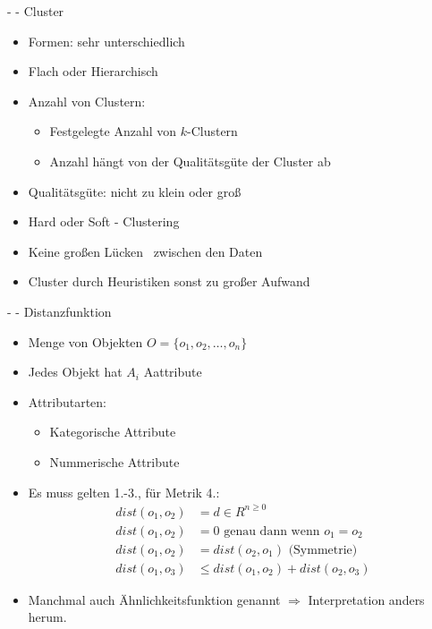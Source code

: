 \documentclass[fleqn,11pt,aspectratio=43]{beamer}
\begin{document}
\begin{frame}{\insertsectionhead - \insertsubsectionhead - Cluster\cite{dwh}}
\begin{itemize}
\item Formen: sehr unterschiedlich
\item Flach oder Hierarchisch
\item Anzahl von Clustern:
\begin{itemize}
\item Festgelegte Anzahl von $k$-Clustern
\item Anzahl hängt von der Qualitätsgüte der Cluster ab
\end{itemize} 
\item Qualitätsgüte: nicht zu klein oder groß
\item Hard oder Soft - Clustering
\item Keine großen \glqq Lücken \grqq\ zwischen den Daten
\item Cluster durch Heuristiken sonst zu großer Aufwand
\end{itemize}
\end{frame}

\begin{frame}{\insertsectionhead - \insertsubsectionhead - Distanzfunktion\cite{ester2000knowledge}}
\begin{itemize}
\item Menge von Objekten $O = \{o_1, o_2, \ldots, o_n\}$
\item Jedes Objekt hat $A_i$ Aattribute
\item Attributarten:
\begin{itemize}
\item Kategorische Attribute
\item Nummerische Attribute
\end{itemize}
\item Es muss gelten 1.-3., für Metrik 4.:
\begin{align}
dist(o_1, o_2) &= d \in R^{n\geq 0}\\
dist(o_1, o_2) &= 0 \mbox{ genau dann wenn } o_1 = o_2\\
dist(o_1, o_2) &= dist(o_2, o_1) \mbox{ (Symmetrie)}\\
dist(o_1, o_3) &\leq dist(o_1, o_2) + dist(o_2, o_3)
\end{align}
\item Manchmal auch Ähnlichkeitsfunktion genannt $\Rightarrow$ Interpretation anders herum.
\end{itemize}
\end{frame}
\end{document}

